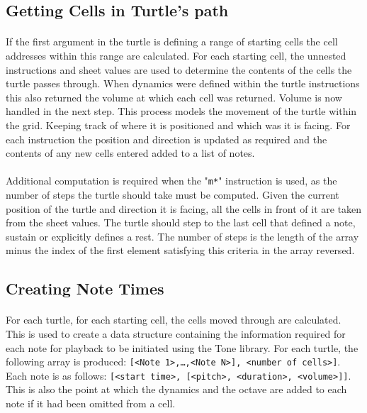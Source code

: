 \subsection{Getting Cells in Turtle's path}

\paragraph{} If the first argument in the turtle is defining a range of starting cells the cell addresses within this range are calculated. For each starting cell, the unnested instructions and sheet values are used to determine the contents of the cells the turtle passes through. When dynamics were defined within the turtle instructions this also returned the volume at which each cell was returned. Volume is now handled in the next step. This process models the movement of the turtle within the grid. Keeping track of where it is positioned and which was it is facing. For each instruction the position and direction is updated as required and the contents of any new cells entered added to a list of notes.

\paragraph{} Additional computation is required when the "\texttt{m*}" instruction is used, as the number of steps the turtle should take must be computed. Given the current position of the turtle and direction it is facing, all the cells  in front of it are taken from the sheet values. The turtle should step to the last cell that defined a note, sustain or explicitly defines a rest. The number of steps is the length of the array minus the index of the first element satisfying this criteria in the array reversed.

\subsection{Creating Note Times}

\paragraph{} For each turtle, for each starting cell, the cells moved through are calculated. This is used to create a data structure containing the information required for each note for playback to be initiated using the Tone library. For each turtle, the following array is produced: \texttt{[<Note 1>,…,<Note N>], <number of cells>]}. Each note is as follows: \texttt{[<start time>, [<pitch>, <duration>, <volume>]]}. This is also the point at which the dynamics and the octave are added to each note if it had been omitted from a cell.

